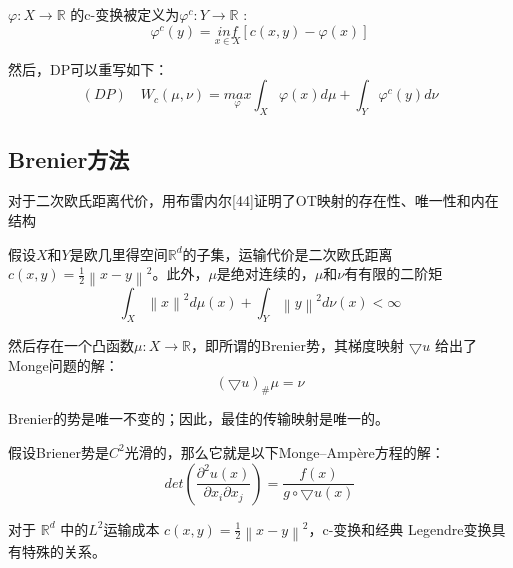 \begin{definition}[c-转换]	\label{definition:3.3}
	$\varphi: X\to \mathbb{R}$ 的c-变换被定义为$\varphi ^ c: Y \to \mathbb{R}$ :
	\begin{equation}
			\varphi ^c(y)= \underset{x \in X }{inf}\left [ c(x,y)-\varphi(x) \right ]
		\label{function:9}
	\end{equation}
	   
	然后，DP可以重写如下：
	\begin{equation}
		(DP) \quad W_c(\mu , \nu) = \underset{\varphi }{max} \int_X \varphi (x)d\mu +\int _Y \varphi ^c (y)d\nu
		\label{function:10}
	\end{equation}
\end{definition}

\subsection{Brenier方法}

对于二次欧氏距离代价，用布雷内尔[44]证明了OT映射的存在性、唯一性和内在结构
\begin{theorem}[Brenier【44】]	\label{theorem:3.1}
	假设$X$和$Y$是欧几里得空间$\mathbb{R}^d$的子集，运输代价是二次欧氏距离$c(x,y)=\frac{1}{2}\left \| x-y \right \| ^2 $。此外，$\mu$是绝对连续的，$\mu$和$\nu$有有限的二阶矩
	\begin{equation}
		\int _X \left \| x \right \| ^2 d\mu(x) + \int _Y \left \| y \right \| ^2 d\nu(x) < \infty 
		\label{function:11}
	\end{equation}
	
	然后存在一个凸函数$\mu : X \to \mathbb{R}$，即所谓的Brenier势，其梯度映射 $\bigtriangledown u$ 给出了Monge问题的解：
	\begin{equation}
		(\bigtriangledown u)_{\#} \mu = \nu
		\label{function:12}
	\end{equation}

	 Brenier的势是唯一不变的；因此，最佳的传输映射是唯一的。
	 
	 假设Briener势是$C^2$光滑的，那么它就是以下Monge–Ampère方程的解：
	 \begin{equation}
	 	det(\frac{\partial ^2 u(x)}{\partial x_i \partial x_j})=\frac{f(x)}{g \circ \bigtriangledown u(x)}
	 	\label{function:13}
	 \end{equation}
 
 	对于 $\mathbb{R}^d$ 中的$L^2$运输成本 $c(x,y)=\frac{1}{2} \left \| x-y \right \|^2  $，c-变换和经典 Legendre变换具有特殊的关系。
\end{theorem}

